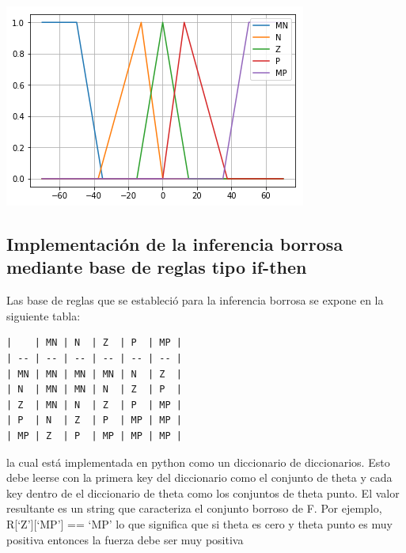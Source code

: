 \documentclass[onecolumn]{article}
\begin{document}
\includegraphics{output_19_1.png}

\hypertarget{implementaciuxf3n-de-la-inferencia-borrosa-mediante-base-de-reglas-tipo-if-then}{%
\subsection{Implementación de la inferencia borrosa mediante base de
reglas tipo
if-then}\label{implementaciuxf3n-de-la-inferencia-borrosa-mediante-base-de-reglas-tipo-if-then}}

Las base de reglas que se estableció para la inferencia borrosa se
expone en la siguiente tabla:

\begin{verbatim}
|    | MN | N  | Z  | P  | MP |
| -- | -- | -- | -- | -- | -- |
| MN | MN | MN | MN | N  | Z  |
| N  | MN | MN | N  | Z  | P  |
| Z  | MN | N  | Z  | P  | MP |
| P  | N  | Z  | P  | MP | MP |
| MP | Z  | P  | MP | MP | MP |
\end{verbatim}

la cual está implementada en python como un diccionario de diccionarios.
Esto debe leerse con la primera key del diccionario como el conjunto de
theta y cada key dentro de el diccionario de theta como los conjuntos de
theta punto. El valor resultante es un string que caracteriza el
conjunto borroso de F. Por ejemplo, R{[}`Z'{]}{[}`MP'{]} == `MP' lo que
significa que si theta es cero y theta punto es muy positiva entonces la
fuerza debe ser muy positiva
\end{document}
